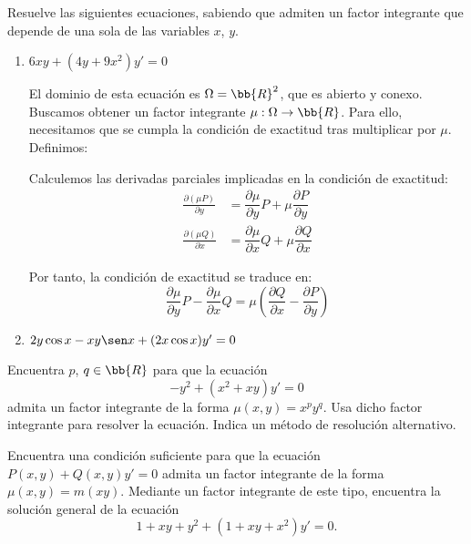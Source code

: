
\begin{ejercicio}
    Resuelve las siguientes ecuaciones, sabiendo que admiten un factor integrante que depende de una sola de las
    variables $x$, $y$.
    \begin{enumerate}
        \item $6xy + (4y + 9x^2)y' = 0$
        
        El dominio de esta ecuación es $\Omega=\bb{R}^2$, que es abierto y conexo. Buscamos obtener un factor integrante $\mu:\Omega \to\bb{R}$. Para ello, necesitamos que se cumpla la condición de exactitud tras multiplicar por $\mu$. Definimos:

        Calculemos las derivadas parciales implicadas en la condición de exactitud:
        \begin{align*}
            \frac{\partial (\mu P)}{\partial y} &= \dfrac{\partial \mu}{\partial y}P+\mu\dfrac{\partial P}{\partial y}\\
            \frac{\partial (\mu Q)}{\partial x} &= \dfrac{\partial \mu}{\partial x}Q+\mu\dfrac{\partial Q}{\partial x}
        \end{align*}

        Por tanto, la condición de exactitud se traduce en:
        \begin{equation*}
            \dfrac{\partial \mu}{\partial y}P- \dfrac{\partial \mu}{\partial x}Q = \mu\left(\dfrac{\partial Q}{\partial x}-\dfrac{\partial P}{\partial y}\right)
        \end{equation*}
        \item $2y \cos x - xy \sen x + (2x \cos x)y' = 0$
    \end{enumerate}
\end{ejercicio}

\begin{ejercicio}
    Encuentra $p$, $q \in \bb{R}$ para que la ecuación
    \[
        -y^2 + (x^2 + xy)y' = 0
    \]
    admita un factor integrante de la forma $\mu(x, y) = x^p y^q$. Usa dicho factor integrante para resolver la ecuación. Indica
    un método de resolución alternativo.
\end{ejercicio}

\begin{ejercicio}
    Encuentra una condición suficiente para que la ecuación $P(x, y) + Q(x, y)y' = 0$ admita un factor integrante de la
    forma $\mu(x, y) = m(xy)$. Mediante un factor integrante de este tipo, encuentra la solución general de la ecuación
    \[
        1 + xy + y^2 + (1 + xy + x^2)y' = 0.
    \]
\end{ejercicio}

